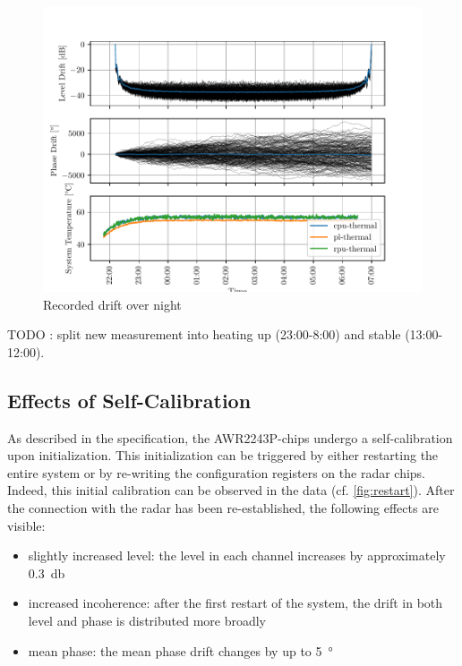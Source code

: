\begin{figure}
    \centering
    \includegraphics[width=\textwidth]{../figures/meas_24-02-16_phase_drift.pdf}
    \caption{Recorded drift over night}
    \label{fig:weekend}
\end{figure}
TODO : split new measurement into heating up (23:00-8:00) and stable (13:00-12:00).


\subsection{Effects of Self-Calibration}
As described in the specification, the AWR2243P-chips undergo a self-calibration upon initialization.
This initialization can be triggered by either restarting the entire system or by re-writing the configuration registers on the radar chips.
Indeed, this initial calibration can be observed in the data (cf. \ref{fig:restart}).
After the connection with the radar has been re-established, the following effects are visible:
\begin{itemize}
    \item slightly increased level: the level in each channel increases by approximately \SI{0.3}{\decibel}
    \item increased incoherence: after the first restart of the system, the drift in both level and phase is distributed more broadly
    \item mean phase: the mean phase drift changes by up to \SI{5}{\degree}
\end{itemize}

